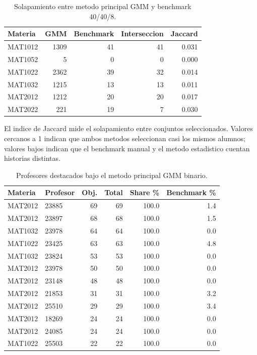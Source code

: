 \begin{table}[H]
\centering
\small
\caption{Solapamiento entre metodo principal GMM y benchmark 40/40/8.}
\begin{tabular}{lrrrr}
\toprule
Materia & GMM & Benchmark & Interseccion & Jaccard \\
\midrule
MAT1012 & 1309 & 41 & 41 & 0.031 \\
MAT1052 & 5 & 0 & 0 & 0.000 \\
MAT1022 & 2362 & 39 & 32 & 0.014 \\
MAT1032 & 1215 & 13 & 13 & 0.011 \\
MAT2012 & 1212 & 20 & 20 & 0.017 \\
MAT2022 & 221 & 19 & 7 & 0.030 \\
\bottomrule
\end{tabular}
\end{table}

El indice de Jaccard mide el solapamiento entre conjuntos seleccionados. Valores cercanos a 1 indican que ambos metodos seleccionan casi los mismos alumnos; valores bajos indican que el benchmark manual y el metodo estadistico cuentan historias distintas.

\begin{table}[H]
\centering
\small
\caption{Profesores destacados bajo el metodo principal GMM binario.}
\begin{tabular}{llrrrr}
\toprule
Materia & Profesor & Obj. & Total & Share \% & Benchmark \% \\
\midrule
MAT2012 & 23885 & 69 & 69 & 100.0 & 1.4 \\
MAT2012 & 23897 & 68 & 68 & 100.0 & 1.5 \\
MAT1032 & 23978 & 64 & 64 & 100.0 & 0.0 \\
MAT1022 & 23425 & 63 & 63 & 100.0 & 4.8 \\
MAT1032 & 23824 & 53 & 53 & 100.0 & 0.0 \\
MAT2012 & 23978 & 50 & 50 & 100.0 & 0.0 \\
MAT2012 & 23148 & 48 & 48 & 100.0 & 0.0 \\
MAT2012 & 21853 & 31 & 31 & 100.0 & 3.2 \\
MAT2012 & 25510 & 29 & 29 & 100.0 & 3.4 \\
MAT2012 & 18269 & 24 & 24 & 100.0 & 0.0 \\
MAT2012 & 24085 & 24 & 24 & 100.0 & 0.0 \\
MAT1022 & 25503 & 22 & 22 & 100.0 & 0.0 \\
\bottomrule
\end{tabular}
\end{table}

